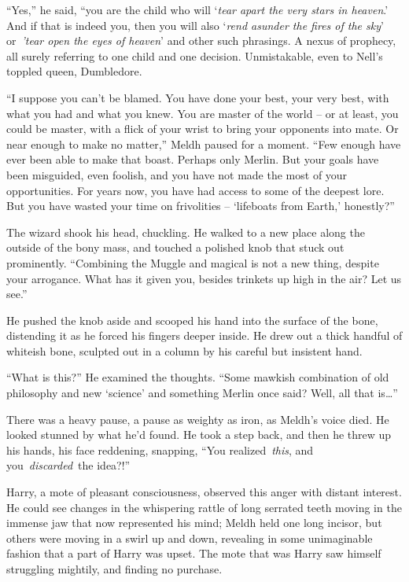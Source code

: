 ``Yes,'' he said, ``you are the child who will `\emph{tear apart the
very stars in heaven}.' And if that is indeed you, then you will also
`\emph{rend asunder the fires of the sky}' or~\emph{'tear open the eyes
of heaven}' and other such phrasings. A nexus of prophecy, all surely
referring to one child and one decision. Unmistakable, even to Nell's
toppled queen, Dumbledore.

``I suppose you can't be blamed. You have done your best, your very
best, with what you had and what you knew. You are master of the world
-- or at least, you could be master, with a flick of your wrist to bring
your opponents into mate. Or near enough to make no matter,'' Meldh
paused for a moment. ``Few enough have ever been able to make that
boast. Perhaps only Merlin. But your goals have been misguided, even
foolish, and you have not made the most of your opportunities. For years
now, you have had access to some of the deepest lore. But you have
wasted your time on frivolities -- `lifeboats from Earth,' honestly?''

The wizard shook his head, chuckling. He walked to a new place along the
outside of the bony mass, and touched a polished knob that stuck out
prominently. ``Combining the Muggle and magical is not a new thing,
despite your arrogance. What has it given you, besides trinkets up high
in the air? Let us see.''

He pushed the knob aside and scooped his hand into the surface of the
bone, distending it as he forced his fingers deeper inside. He drew out
a thick handful of whiteish bone, sculpted out in a column by his
careful but insistent hand.

``What is this?'' He examined the thoughts. ``Some mawkish combination
of old philosophy and new `science' and something Merlin once said?
Well, all that is\ldots{}''

There was a heavy pause, a pause as weighty as iron, as Meldh's voice
died. He looked stunned by what he'd found. He took a step back, and
then he threw up his hands, his face reddening, snapping, ``You
realized~\emph{this}, and you~\emph{discarded}~the idea?!''

Harry, a mote of pleasant consciousness, observed this anger with
distant interest. He could see changes in the whispering rattle of long
serrated teeth moving in the immense jaw that now represented his mind;
Meldh held one long incisor, but others were moving in a swirl up and
down, revealing in some unimaginable fashion that a part of Harry was
upset. The mote that was Harry saw himself struggling mightily, and
finding no purchase.

